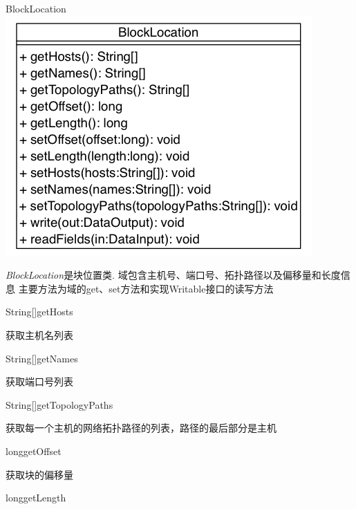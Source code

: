 \begin{XeClass}{BlockLocation}
\includegraphics[width=\textwidth]{cdig/BlockLocation.png}
     
 \emph{BlockLocation}是块位置类.
 域包含主机号、端口号、拓扑路径以及偏移量和长度信息
 主要方法为域的get、set方法和实现Writable接口的读写方法

    \begin{XeMethod}{\XePublic}{String[]}{getHosts}
         
 获取主机名列表

    \end{XeMethod}

    \begin{XeMethod}{\XePublic}{String[]}{getNames}
         
 获取端口号列表

    \end{XeMethod}

    \begin{XeMethod}{\XePublic}{String[]}{getTopologyPaths}
         
 获取每一个主机的网络拓扑路径的列表，路径的最后部分是主机

    \end{XeMethod}

    \begin{XeMethod}{\XePublic}{long}{getOffset}
         
 获取块的偏移量

    \end{XeMethod}

    \begin{XeMethod}{\XePublic}{long}{getLength}
         

\end{XeMethod}
\end{XeClass}
